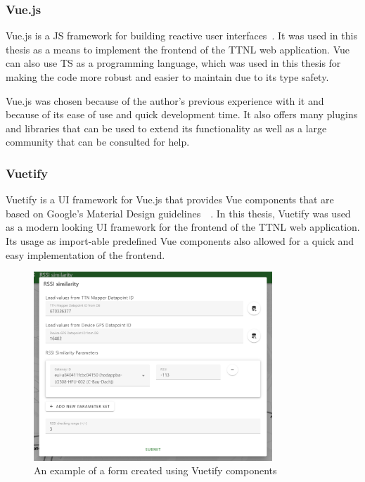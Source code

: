 \subsubsection{Vue.js}

Vue.js is a \ac{JS} framework for building reactive user interfaces~\cite{evan_you_vuejs_2023}.
It was used in this thesis as a means to implement the frontend of the \ac{TTNL} web application.
Vue can also use \ac{TS} as a programming language, which was used in this thesis for making the code more robust and easier to maintain due to its type safety.

Vue.js was chosen because of the author's previous experience with it and because of its ease of use and quick development time.
It also offers many plugins and libraries that can be used to extend its functionality as well as a large community that can be consulted for help.

\subsubsection{Vuetify}

Vuetify is a \ac{UI} framework for Vue.js that provides Vue components that are based on Google's Material Design guidelines~\cite{vuetify_vuetify_2023}~\cite{google_llc_material_nodate}.
In this thesis, Vuetify was used as a modern looking \ac{UI} framework for the frontend of the \ac{TTNL} web application.
Its usage as import-able predefined Vue components also allowed for a quick and easy implementation of the frontend.

\begin{figure}
    \centering
    \includegraphics[width=0.8\textwidth]{pictures/ttn-locator/frontend/vuetify-form-example.png}
    \caption{An example of a form created using Vuetify components\label{fig:vuetify-form-example}}
\end{figure}

